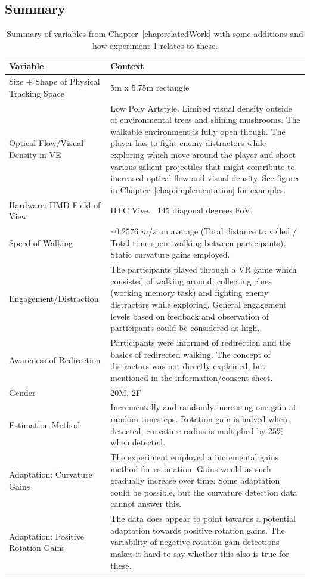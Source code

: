 \subsection{Summary}
\begin{table}[h!]
\centering
\begin{tabularx}{\textwidth}{|X|X|}
\hline
Variable & Context \\
\hline
Size + Shape of Physical Tracking Space & 5m x 5.75m rectangle \\
\hline
Optical Flow/Visual Density in VE & Low Poly Artstyle. Limited visual density outside of environmental trees and shining mushrooms. The walkable environment is fully open though. The player has to fight enemy distractors while exploring which move around the player and shoot various salient projectiles that might contribute to increased optical flow and visual density. See figures in Chapter~\ref{chap:implementation} for examples.\\
\hline
Hardware: HMD Field of View & HTC Vive. ~145 diagonal degrees FoV. \\
\hline
Speed of Walking & \textasciitilde$0.2576$ $m/s$ on average (Total distance travelled / Total time spent walking between participants). Static curvature gains employed. \\
\hline
Engagement/Distraction & The participants played through a VR game which consisted of walking around, collecting clues (working memory task) and fighting enemy distractors while exploring. General engagement levels based on feedback and observation of participants could be considered as high. \\
\hline
Awareness of Redirection & Participants were informed of redirection and the basics of redirected walking. The concept of distractors was not directly explained, but mentioned in the information/consent sheet. \\
\hline
Gender & 20M, 2F \\
\hline
Estimation Method & Incrementally and randomly increasing one gain at random timesteps. Rotation gain is halved when detected, curvature radius is multiplied by 25\% when detected. \\
\hline
Adaptation: Curvature Gains & The experiment employed a incremental gains method for estimation. Gains would as such gradually increase over time. Some adaptation could be possible, but the curvature detection data cannot answer this. \\
\hline
Adaptation: Positive Rotation Gains & The data does appear to point towards a potential adaptation towards positive rotation gains. The variability of negative rotation gain detections makes it hard to say whether this also is true for these. \\
\hline
\end{tabularx}
\caption{Summary of variables from Chapter~\ref{chap:relatedWork} with some additions and how experiment 1 relates to these.}
\label{table:ex1VariableSummary}
\end{table}

